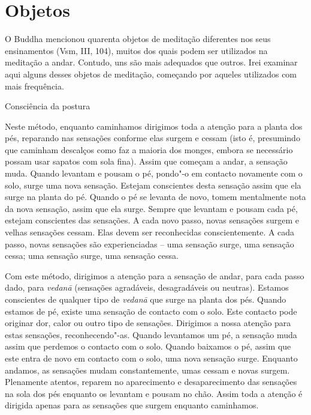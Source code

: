 
\chapter{Objetos}

O Buddha mencionou quarenta objetos de meditação diferentes nos
seus ensinamentos (Vsm, III, 104), muitos dos quais podem ser utilizados
na meditação a andar. Contudo, uns são mais adequados que outros. Irei
examinar aqui alguns desses objetos de meditação, começando por aqueles
utilizados com mais frequência.

\begin{siderule-quote}
  Consciência da postura
\end{siderule-quote}

Neste método, enquanto caminhamos dirigimos toda a atenção para a planta
dos pés, reparando nas sensações conforme elas surgem e cessam (isto é,
presumindo que caminham descalços como faz a maioria dos monges, embora
se necessário possam usar sapatos com sola fina). Assim que começam a
andar, a sensação muda. Quando levantam e pousam o pé, pondo"-o em
contacto novamente com o solo, surge uma nova sensação. Estejam
conscientes desta sensação assim que ela surge na planta do pé. Quando o
pé se levanta de novo, tomem mentalmente nota da nova sensação, assim
que ela surge. Sempre que levantam e pousam cada pé, estejam conscientes
das sensações. A cada novo passo, novas sensações surgem e velhas
sensações cessam. Elas devem ser reconhecidas conscientemente. A cada
passo, novas sensações são experienciadas -- uma sensação surge, uma
sensação cessa; uma sensação surge, uma sensação cessa.

Com este método, dirigimos a atenção para a sensação de andar, para cada
passo dado, para \emph{vedanā} (sensações agradáveis, desagradáveis ou
neutras). Estamos conscientes de qualquer tipo de \emph{vedanā} que
surge na planta dos pés. Quando estamos de pé, existe uma sensação de
contacto com o solo. Este contacto pode originar dor, calor ou outro
tipo de sensações. Dirigimos a nossa atenção para estas sensações,
reconhecendo"-as. Quando levantamos um pé, a sensação muda assim que
perdemos o contacto com o solo. Quando baixamos o pé, assim que este
entra de novo em contacto com o solo, uma nova sensação surge. Enquanto
andamos, as sensações mudam constantemente, umas cessam e novas surgem.
Plenamente atentos, reparem no aparecimento e desaparecimento das
sensações na sola dos pés enquanto os levantam e pousam no chão. Assim
toda a atenção é dirigida apenas para as sensações que surgem enquanto
caminhamos.

